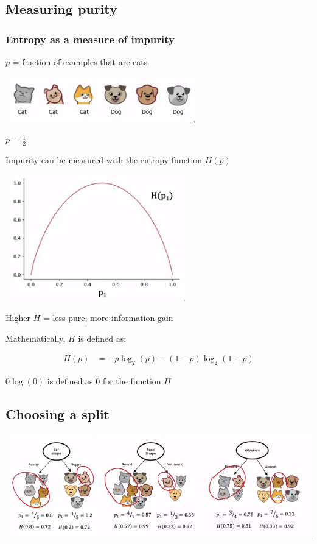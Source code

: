 \documentclass[12pt]{article}
\begin{document}
\subsection{Measuring purity}

\subsubsection{Entropy as a measure of impurity}

$p$ = fraction of examples that are cats

\includegraphics{purity}

$p$ = $\frac{1}{2}$

Impurity can be measured with the entropy function $H(p)$

\includegraphics{entropy}

Higher $H$ = less pure, more information gain

Mathematically, $H$ is defined as:

\begin{align*}
    H(p) &= -p \log_2(p) - (1 - p) \log_2(1 - p)
\end{align*}

$0 \log(0)$ is defined as 0 for the function $H$

\subsection{Choosing a split}

\includegraphics[scale=.6]{split}
\end{document}
